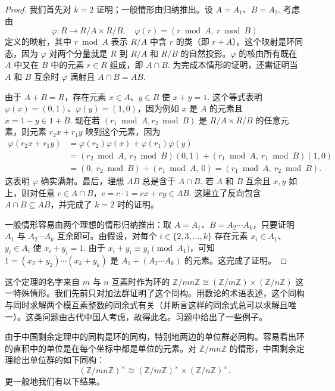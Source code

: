 \begin{proof}
我们首先对 \(k = 2\) 证明；一般情形由归纳推出。设 \(A = A_1\)、\(B = A_2\). 考虑由
\[
\varphi : R \to R/A \times R/B, \quad \varphi(r) = (r \bmod A,\ r \bmod B)
\]
定义的映射，其中 \(r \bmod A\) 表示 \(R/A\) 中含 \(r\) 的类（即 \(r + A\)）。这个映射是环同态，因为 \(\varphi\) 对两个分量就是 \(R\) 到 \(R/A\) 和 \(R/B\) 的自然投影。\(\varphi\) 的核由所有既在 \(A\) 中又在 \(B\) 中的元素 \(r \in R\) 组成，即 \(A \cap B\). 为完成本情形的证明，还需证明当 \(A\) 和 \(B\) 互余时 \(\varphi\) 满射且 \(A \cap B = AB\).

由于 \(A + B = R\)，存在元素 \(x \in A\)、\(y \in B\) 使 \(x + y = 1\). 这个等式表明 \(\varphi(x) = (0, 1)\)、\(\varphi(y) = (1, 0)\)，因为例如 \(x\) 是 \(A\) 的元素且 \(x = 1 - y \in 1 + B\). 现在若 \((r_1 \bmod A, r_2 \bmod B)\) 是 \(R/A \times R/B\) 的任意元素，则元素 \(r_2x + r_1y\) 映到这个元素，因为
\[
\begin{aligned}
\varphi(r_2x + r_1y) &= \varphi(r_2)\varphi(x) + \varphi(r_1)\varphi(y) \\
&= (r_2 \bmod A,\ r_2 \bmod B)(0, 1) + (r_1 \bmod A,\ r_1 \bmod B)(1, 0) \\
&= (0,\ r_2 \bmod B) + (r_1 \bmod A,\ 0) = (r_1 \bmod A,\ r_2 \bmod B).
\end{aligned}
\]
这表明 \(\varphi\) 确实满射。最后，理想 \(AB\) 总是含于 \(A \cap B\). 若 \(A\) 和 \(B\) 互余且 \(x, y\) 如上，则对任意 \(c \in A \cap B\)，\(c = c\cdot 1 = cx + cy \in AB\). 这建立了反向包含 \(A \cap B \subseteq AB\)，并完成了 \(k = 2\) 时的证明。

一般情形容易由两个理想的情形归纳推出：取 \(A = A_1\)、\(B = A_2\cdots A_k\)，只要证明 \(A_1\) 与 \(A_2\cdots A_k\) 互余即可。由假设，对每个 \(i \in \{2, 3, \ldots, k\}\) 存在元素 \(x_i \in A_1\)、\(y_i \in A_i\) 使 \(x_i + y_i = 1\). 由于 \(x_i + y_i \equiv y_i \pmod{A_1}\)，可知 \(1 = (x_2+y_2)\cdots(x_k+y_k)\) 是 \(A_1 + (A_2\cdots A_k)\) 的元素。这完成了证明。
\end{proof}

这个定理的名字来自 \(m\) 与 \(n\) 互素时作为环的 \(\mathbb{Z}/mn\mathbb{Z} \cong (\mathbb{Z}/m\mathbb{Z}) \times (\mathbb{Z}/n\mathbb{Z})\) 这一特殊情形。我们先前只对加法群证明了这个同构。用数论的术语表述，这个同构与同时求解两个模互素整数的同余式有关（并断言这样的同余式总可以求解且唯一）。这类问题由古代中国人考虑，故得此名。习题中给出了一些例子。

由于中国剩余定理中的同构是环的同构，特别地两边的单位群必同构。容易看出环的直积中的单位是在每个坐标中都是单位的元素。对 \(\mathbb{Z}/mn\mathbb{Z}\) 的情形，中国剩余定理给出单位群的如下同构：
\[
(\mathbb{Z}/mn\mathbb{Z})^\times \cong (\mathbb{Z}/m\mathbb{Z})^\times \times (\mathbb{Z}/n\mathbb{Z})^\times.
\]
更一般地我们有以下结果。


